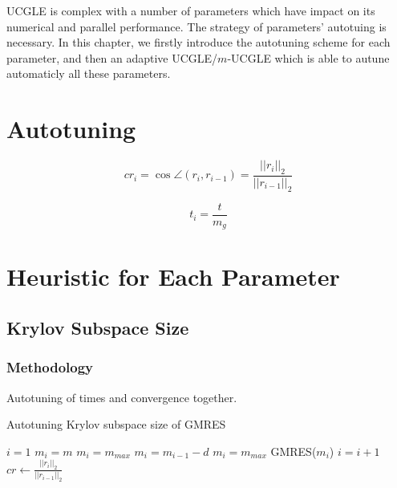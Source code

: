 \begin{displayquote}
	\textsf{UCGLE is complex with a number of parameters which have impact on its numerical and parallel performance. The strategy of parameters' autotuing is necessary. In this chapter, we firstly introduce the autotuning scheme for each parameter, and then an adaptive UCGLE/$m$-UCGLE which is able to autune automaticly all these parameters.}
\end{displayquote}

\vspace{0.6in}

\section{Autotuning}

\begin{equation}
	cr_i=\cos\angle(r_i,r_{i-1})=\frac{||r_i||_2}{||r_{i-1}||_2}
\end{equation}

\begin{equation}
t_i=\frac{t}{m_g}
\end{equation}

\section{Heuristic for Each Parameter}
\subsection{Krylov Subspace Size}
\subsubsection{Methodology}

Autotuning of times and convergence together.

\begin{algorithm}[htbp]{}
	\caption{Autotuning Krylov subspace size of GMRES}   
	\label{alg:gmres-krylov-autotuning}   
	\begin{algorithmic}[1]
		
	\State $i=1$
	\State $m_i=m$
		\State $m_i=m_{max}$
				\State $m_i = m_{i-1}-d$
			\Else
				\State $m_i=m_{max}$
			\EndIf
		\EndIf
	\State GMRES($m_i$)
	\State $i=i+1$
	\State $cr \leftarrow \frac{||r_i||_2}{||r_{i-1}||_2}$
	\EndWhile
	\EndFunction
		
	\end{algorithmic}  
\end{algorithm}

